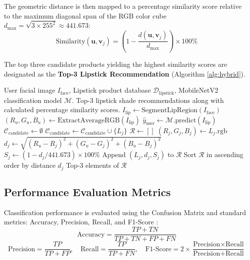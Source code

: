 \documentclass[10pt,a4paper]{article}
\begin{document}
The geometric distance is then mapped to a percentage similarity score relative to the maximum diagonal span of the RGB color cube $d_{\max} = \sqrt{3 \times 255^2} \approx 441.673$:
\begin{equation}
  \text{Similarity}(\mathbf{u}, \mathbf{v}_j) = \left( 1 - \frac{d(\mathbf{u}, \mathbf{v}_j)}{d_{\max}} \right) \times 100\%
  \label{eq:similarity}
\end{equation}

The top three candidate products yielding the highest similarity scores are designated as the \textbf{Top-3 Lipstick Recommendation} (Algorithm \ref{alg:hybrid}).

\begin{algorithm}[htbp]
\caption{Hybrid Recommendation System Algorithm for Lipstick Shade Recommendation}
\label{alg:hybrid}
\fontsize{8.5pt}{10.5pt}\selectfont
\begin{algorithmic}[1]
\Require User facial image $I_{\text{face}}$, Lipstick product database $\mathcal{D}_{\text{lipstick}}$, MobileNetV2 classification model $\mathcal{M}$.
\Ensure Top-3 lipstick shade recommendations along with calculated percentage similarity scores.
\State $I_{\text{lip}} \gets \text{SegmentLipRegion}(I_{\text{face}})$ 
\State $(R_u, G_u, B_u) \gets \text{ExtractAverageRGB}(I_{\text{lip}})$
\State $\hat{y}_{\text{user}} \gets \mathcal{M}.\text{predict}(I_{\text{lip}})$ 
\State $\mathcal{C}_{\text{candidate}} \gets \emptyset$
 
        \State $\mathcal{C}_{\text{candidate}} \gets \mathcal{C}_{\text{candidate}} \cup \{L_j\}$
    \EndIf
\EndFor
\State $\mathcal{R} \gets []$
 
    \State $(R_j, G_j, B_j) \gets L_j.\text{rgb}$
    \State $d_j \gets \sqrt{(R_u - R_j)^2 + (G_u - G_j)^2 + (B_u - B_j)^2}$
    \State $S_j \gets (1 - d_j / 441.673) \times 100\%$
    \State Append $(L_j, d_j, S_j)$ to $\mathcal{R}$
\EndFor
\State Sort $\mathcal{R}$ in ascending order by distance $d_j$
\State \Return Top-3 elements of $\mathcal{R}$
\end{algorithmic}
\end{algorithm}

\subsection{Performance Evaluation Metrics}
Classification performance is evaluated using the Confusion Matrix and standard metrics: Accuracy, Precision, Recall, and F1-Score \cite{powers2011evaluation}:
\begin{equation}
  \text{Accuracy} = \frac{TP + TN}{TP + TN + FP + FN}
\end{equation}
\begin{equation}
  \text{Precision} = \frac{TP}{TP + FP}, \quad \text{Recall} = \frac{TP}{TP + FN}, \quad \text{F1-Score} = 2 \times \frac{\text{Precision} \times \text{Recall}}{\text{Precision} + \text{Recall}}
\end{equation}
\end{document}
